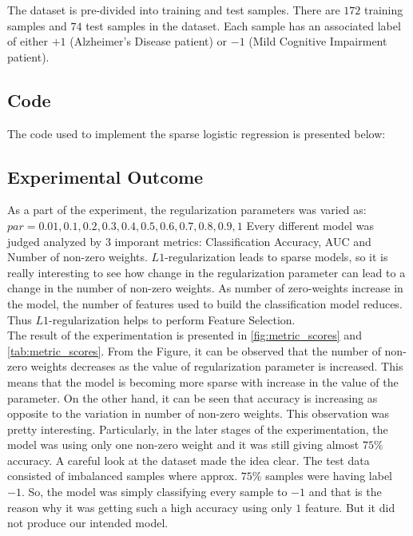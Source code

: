 \documentclass[11pt]{article}
\begin{document}
The dataset is pre-divided into training and test samples. There are $172$ training samples and $74$ test samples in the dataset. Each sample has an associated label of either $+1$ (Alzheimer's Disease patient) or $-1$ (Mild Cognitive Impairment patient).  	

\subsection{Code}
The code used to implement the sparse logistic regression is presented below:


\subsection{Experimental Outcome}

As a part of the experiment, the regularization parameters was varied as:\\ 
$par = 0.01, 0.1, 0.2, 0.3, 0.4, 0.5, 0.6, 0.7, 0.8, 0.9, 1$
Every different model was judged analyzed by $3$ imporant metrics: Classification Accuracy, AUC and Number of non-zero weights. $L1$-regularization leads to sparse models, so it is really interesting to see how change in the regularization parameter can lead to a change in the number of non-zero weights. As number of zero-weights increase in the model, the number of features used to build the classification model reduces. Thus $L1$-regularization helps to perform Feature Selection.\\

The result of the experimentation is presented in \autoref{fig:metric_scores} and \autoref{tab:metric_scores}. From the Figure, it can be observed that the number of non-zero weights decreases as the value of regularization parameter is increased. This means that the model is becoming more sparse with increase in the value of the parameter. On the other hand, it can be seen that accuracy is increasing as opposite to the variation in number of non-zero weights. This observation was pretty interesting. Particularly, in the later stages of the experimentation, the model was using only one non-zero weight and it was still giving almost $75\%$ accuracy. A careful look at the dataset made the idea clear. The test data consisted of imbalanced samples where approx. $75\%$ samples were having label $-1$. So, the model was simply classifying every sample to $-1$ and that is the reason why it was getting such a high accuracy using only $1$ feature. But it did not produce our intended model.\\
\end{document}

